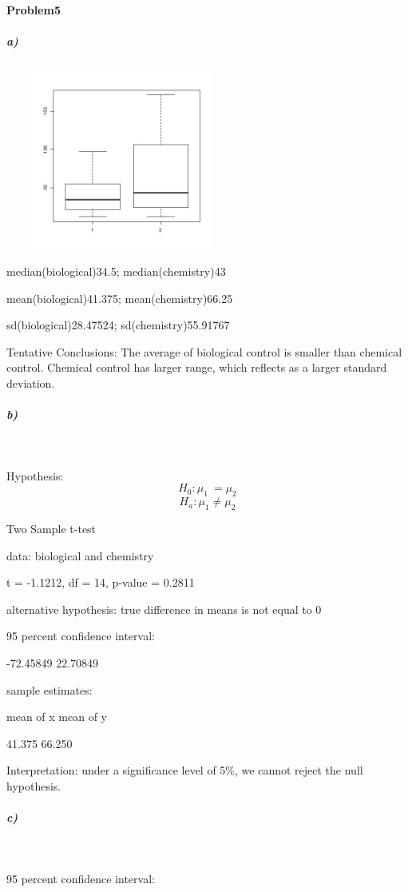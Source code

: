 \documentclass{article}
\begin{document}
\paragraph{Problem5}
\subparagraph{a)}~{}
\newline
\includegraphics[height=6cm,width=7cm]{5a.jpg}

median(biological)34.5;
median(chemistry)43

mean(biological)41.375;
mean(chemistry)66.25

sd(biological)28.47524;
sd(chemistry)55.91767

Tentative Conclusions: The average of biological control is smaller than chemical control. Chemical control has larger range, which reflects as a larger standard deviation.
\subparagraph{b)}~{}

Hypothesis:\[H_0:\mu_1\ = \mu_2\] \[H_a:\mu_1 \neq \mu_2\]

Two Sample t-test

data:  biological and chemistry

t = -1.1212, df = 14, p-value = 0.2811

alternative hypothesis: true difference in means is not equal to 0

95 percent confidence interval:

 -72.45849  22.70849

sample estimates:

mean of x mean of y 

   41.375    66.250 

Interpretation: under a significance level of 5\%, we cannot reject the null hypothesis.
\subparagraph{c)}~{}

95 percent confidence interval:
\end{document}
